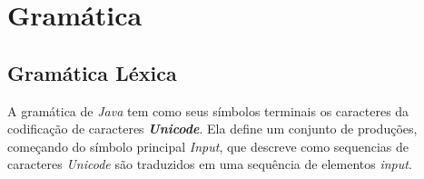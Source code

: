 \documentclass[conference]{IEEEtran}
\begin{document}
\begin{comment}
A linguagem Java surgiu em 1995 e foi criada por James Gosling, que trabalhava na empresa Sun Microsystems, hoje Oracle. Bastante usada no meio acadêmico para ensino de orientação a objetos, é umas das linguagens de programação mais populares atualmente. Umas das razões dessa popularidade se justifica pelo fato de ela ser multiplataforma, isso é possível porque o seu o código é compilado para bytecode que, em seguida, é interpretado pela Java Virtual Machine.
Ela possui uma sintaxe muito parecida com C, C++ e C#, mas com diferentes bibliotecas. Por ser multiplataforma os programas em Java podem ser executados em diversos sistemas operacionais, com a condição que o interpretador esteja na máquina.
A Máquina Virtual Java converte o código Java em instruções que o sistema operacional reconheça. Por existir diversos computadores com variados sistemas operacionais, os programas Java podem ser processados em qualquer lugar. O lado negativo é que o programa se torna mais lento do que em comparação com outras linguagens.
Linguagens como C ou C++ por outro lado, necessitam de um compilador para cada plataforma o que pode alterar também a escrita de programas. Para cada plataforma é necessário recompilar o código fonte, isso geral um arquivo binário diferente. Embora pode ser mais custoso esse processo, ele pode ser benéfico pois o desempenho aumenta.
A JVM permite que um único arquivo binário seja gerado para ser executado em diversas plataformas. 
Desde a sua criação, Java foi planejada em duas partes. Como inglês e português, Java tem sua gramática e nomes comumente usados. A linguagem de programação Java tem suas especificações (sua gramática) e sua interface de programação de aplicações. 
A linguagem de especificação Java é um documento que inclui regras como “Sempre abra parênteses depois da palavra for” e “use asteriscos para multiplicar dois números”. A linguagem de especificação é relativamente pequena em comparação com outras linguagens.

\end{comment}

\section{Gramática}

\subsection{Gramática Léxica}\label{AA}
A gramática de \textit{Java} tem como seus símbolos terminais os caracteres da codificação de caracteres \textit{\textbf{Unicode}}. Ela define um conjunto de produções, começando do símbolo principal \textit{Input}, que descreve como sequencias de caracteres \textit{Unicode} são traduzidos em uma sequência de elementos \textit{input}.
\end{document}
